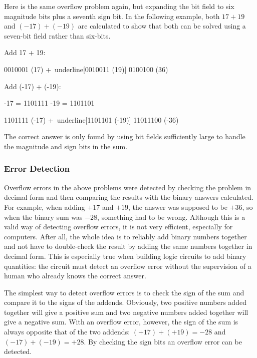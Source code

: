 Here is the same overflow problem again, but expanding the bit field to six magnitude bits plus a seventh sign bit. In the following example, both $ 17 + 19 $ and $ (-17) + (-19) $ are calculated to show that both can be solved using a seven-bit field rather than six-bits. 

Add 17 + 19:

\begin{binDisp}[commandchars=~\[\], samepage=true]
     0010001  (17)
    +~underline[0010011  (19)]
     0100100  (36)
\end{binDisp}

Add (-17) + (-19):

\begin{binDisp}[commandchars=~\[\], samepage=true]
     -17 = 1101111
     -19 = 1101101

     1101111  (-17)
    +~underline[1101101  (-19)]
    11011100  (-36)
\end{binDisp}

The correct answer is only found by using bit fields sufficiently large to handle the magnitude and sign bits in the sum.

\subsubsection{Error Detection}
\label{MO:subsub:error_detection}

Overflow errors in the above problems were detected by checking the problem in decimal form and then comparing the results with the binary answers calculated. For example, when adding $ +17 $ and $ +19 $, the answer was supposed to be $ +36 $, so when the binary sum was $ -28 $, something had to be wrong. Although this is a valid way of detecting overflow errors, it is not very efficient, especially for computers. After all, the whole idea is to reliably add binary numbers together and not have to double-check the result by adding the same numbers together in decimal form. This is especially true when building logic circuits to add binary quantities: the circuit must detect an overflow error without the supervision of a human who already knows the correct answer.

The simplest way to detect overflow errors is to check the sign of the sum and compare it to the signs of the addends. Obviously, two positive numbers added together will give a positive sum and two negative numbers added together will give a negative sum. With an overflow error, however, the sign of the sum is always opposite that of the two addends: $ (+17) + (+19) = -28 $ and $ (-17) + (-19) = +28 $. By checking the sign bits an overflow error can be detected. 

